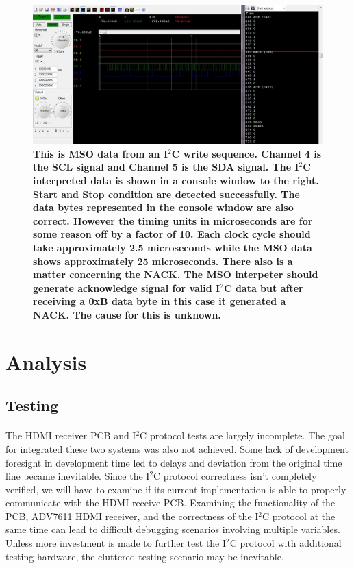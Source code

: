 \documentclass[pdftex,12pt,a4paper]{article}
\begin{document}
\begin{figure}[H]
\centering
\includegraphics[width=\textwidth]{mso.jpg}
\caption{\textbf{This is MSO data from an I$^2$C write sequence. Channel 4 is the SCL signal and Channel 5 is the SDA signal. The I$^2$C interpreted data is shown in a console window to the right. Start and Stop condition are detected successfully. The data bytes represented in the console window are also correct. However the timing units in microseconds are for some reason off by a factor of 10. Each clock cycle should take approximately 2.5 microseconds while the MSO data shows approximately 25 microseconds. There also is a matter concerning the NACK. The MSO interpeter should generate acknowledge signal for valid I$^2$C data but after receiving a 0xB data byte in this case it generated a NACK. The cause for this is unknown. }}
\label{fig:mso}
\end{figure}

\section{Analysis}

\subsection{Testing}

\paragraph{}
The HDMI receiver PCB and I$^2$C protocol tests are largely incomplete. The goal for integrated these two systems was also not achieved. Some lack of development foresight in development time led to delays and deviation from the original time line became inevitable. Since the I$^2$C protocol correctness isn't completely verified, we will have to examine if its current implementation is able to properly communicate with the HDMI receive PCB. Examining the functionality of the PCB, ADV7611 HDMI receiver, and the correctness of the I$^2$C protocol at the same time can lead to difficult debugging scenarios involving multiple variables. Unless more investment is made to further test the I$^2$C protocol with additional testing hardware, the cluttered testing scenario may be inevitable.
\end{document}
